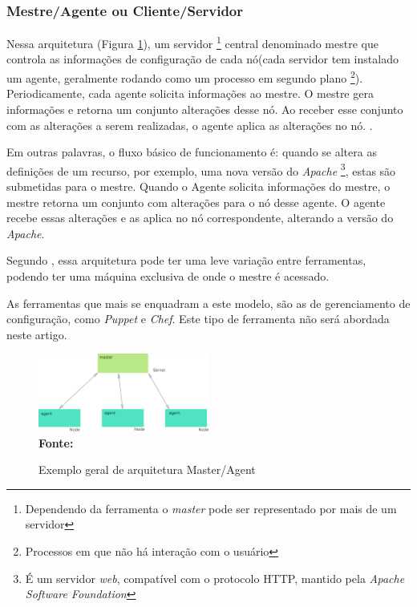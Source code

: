 \subsubsection{Mestre/Agente ou Cliente/Servidor} \label{cliente-servidor}
 
  Nessa arquitetura (Figura \ref{fig:figura7}), um servidor \footnote{Dependendo da ferramenta o \textit{master} pode ser representado por mais de um servidor} central denominado mestre que controla as informações de configuração de cada nó(cada servidor tem instalado  um agente, geralmente rodando como um processo em segundo plano \footnote{Processos em que não há interação com o usuário}). Periodicamente, cada agente solicita informações ao mestre. O mestre gera informações e retorna um conjunto alterações desse nó. Ao receber esse conjunto com as alterações a serem realizadas, o agente aplica as alterações no nó. \cite{puppetlabs}. 
 
 Em outras palavras, o fluxo básico de funcionamento é: quando se altera as definições de um recurso, por exemplo, uma nova versão do \textit{Apache} \footnote{É um servidor \textit{web}, compatível com o protocolo HTTP, mantido pela \textit{Apache Software Foundation }}, estas são submetidas para o mestre. Quando o Agente solicita informações do mestre, o mestre retorna um conjunto com alterações para o nó desse agente. O agente recebe essas alterações e as aplica no nó correspondente, alterando a versão do \textit{Apache}.   

Segundo , essa arquitetura pode ter uma leve variação entre ferramentas, podendo ter uma máquina exclusiva de onde o mestre é acessado.

As ferramentas que mais se enquadram a este modelo, são as de gerenciamento de configuração, como \textit{Puppet} e \textit{Chef}. Este tipo de ferramenta não será abordada neste artigo. 
 
 \begin{figure}[ht]
	\centering	
	\caption[\hspace{0.1cm}Exemplo arquitetura Master/Agent]{Exemplo geral de arquitetura Master/Agent}
	\vspace{-0.4cm}
	\includegraphics[width=0.5\textwidth]{figuras/master-agent.png}
	 \vspace{-0.2cm}
	\\\textbf{\footnotesize Fonte: \cite{Harit}}
	\label{fig:figura7}
\end{figure}
\vspace{-0.5cm}

